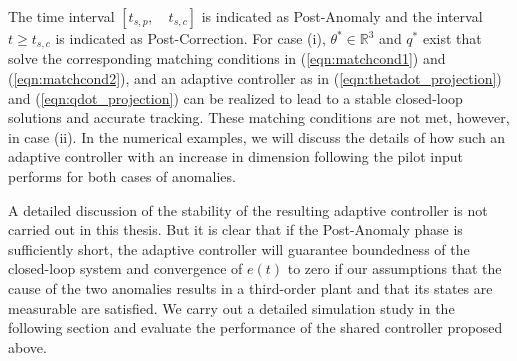 The time interval $[t_{s,p}, \quad t_{s,c}]$ is indicated as Post-Anomaly and the interval $t \geq t_{s,c}$ is indicated as Post-Correction. For case (i), $\theta^* \in \mathbb{R}^3$ and $q^*$ exist that solve the corresponding matching conditions in (\ref{eqn:matchcond1}) and (\ref{eqn:matchcond2}), and an adaptive controller as in (\ref{eqn:thetadot_projection}) and (\ref{eqn:qdot_projection}) can be realized to lead to a stable closed-loop solutions and accurate tracking. These matching conditions are not met, however, in case (ii). In the numerical examples, we will discuss the details of how such an adaptive controller with an increase in dimension following the pilot input performs for both cases of anomalies. 

A detailed discussion of the stability of the resulting adaptive controller is not carried out in this thesis. But it is clear that if the Post-Anomaly phase is sufficiently short, the adaptive controller will guarantee boundedness of the closed-loop system and convergence of $e(t)$ to zero if our assumptions that the cause of the two anomalies results in a third-order plant and that its states are measurable are satisfied. We carry out a detailed simulation study in the following section and evaluate the performance of the shared controller proposed above.

